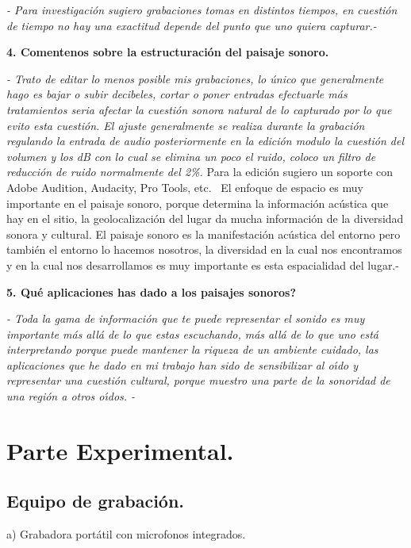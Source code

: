 \qquad\textit{- Para investigaci\'{o}n sugiero grabaciones tomas en distintos
tiempos, en cuesti\'{o}n de tiempo no hay una exactitud depende del punto que
uno quiera capturar.-}

\textbf{4. Comentenos sobre la estructuraci\'{o}n del paisaje sonoro.}

\textit{- Trato de editar lo menos posible mis grabaciones, lo \'{u}nico que
generalmente hago es bajar o subir decibeles, cortar o poner entradas
efectuarle m\'{a}s tratamientos seria afectar la cuesti\'{o}n sonora natural
de lo capturado por lo que evito esta cuesti\'{o}n. El ajuste generalmente se
realiza durante la grabaci\'{o}n regulando la entrada de audio posteriormente
en la edici\'{o}n modulo la cuesti\'{o}n del volumen y los dB con lo cual se
elimina un poco el ruido, coloco un filtro de reducci\'{o}n de ruido
normalmente del 2\%. }Para la edici\'{o}n sugiero un soporte con Adobe
Audition, Audacity, Pro Tools, etc. \ El enfoque de espacio es muy importante
en el paisaje sonoro, porque determina la informaci\'{o}n ac\'{u}stica que hay
en el sitio, la geolocalizaci\'{o}n del lugar da mucha informaci\'{o}n de la
diversidad sonora y cultural. El paisaje sonoro es la manifestaci\'{o}n
ac\'{u}stica del entorno pero tambi\'{e}n el entorno lo hacemos nosotros, la
diversidad en la cual nos encontramos y en la cual nos desarrollamos es muy
importante es esta espacialidad del lugar.-

\textbf{5. \textquestiondown Qu\'{e} aplicaciones has dado a los paisajes
sonoros?}

\textit{- Toda la gama de informaci\'{o}n que te puede representar el sonido
es muy importante m\'{a}s all\'{a} de lo que estas escuchando, m\'{a}s
all\'{a} de lo que uno est\'{a} interpretando porque puede mantener la riqueza
de un ambiente cuidado, las aplicaciones que he dado en mi trabajo han sido de
sensibilizar al o\'{\i}do y representar una cuesti\'{o}n cultural, porque
muestro una parte de la sonoridad de una regi\'{o}n a otros o\'{\i}dos. -}

\section{Parte Experimental.}

\subsection{Equipo de grabaci\'{o}n.}

a) Grabadora port\'{a}til con microfonos integrados.

